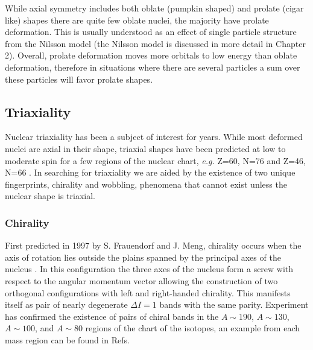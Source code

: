 While axial symmetry includes both oblate (pumpkin shaped) and prolate (cigar like) shapes there are quite few oblate nuclei, the majority have prolate deformation. This is usually understood as an effect of single particle structure from the Nilsson model (the Nilsson model is discussed in more detail in Chapter 2). Overall, prolate deformation moves more orbitals to low energy than oblate deformation, therefore in situations where there are several particles a sum over these particles will favor prolate shapes.

\subsection{Triaxiality}
\label{ssec:intro-rot-triax}
Nuclear triaxiality has been a subject of interest for years. While most deformed nuclei are axial in their shape, triaxial shapes have been predicted at low to moderate spin for a few regions of the nuclear chart, \emph{e.g.} Z=60, N=76 and Z=46, N=66  \cite{groundStateTriax}. In searching for triaxiality we are aided by the existence of two unique fingerprints, chirality and wobbling, phenomena that cannot exist unless the nuclear shape is triaxial.

\subsubsection{Chirality}
\label{sssec:intro-rot-chiral}
First predicted in 1997  by S. Frauendorf and J. Meng, chirality occurs when the axis of rotation lies outside the plains spanned by the principal axes of the nucleus \cite{frauendorfChirality,chiralityOfNuclearRotation,frauendorfTAC}. In this configuration the three axes of the nucleus form a screw with respect to the angular momentum vector allowing the construction of two orthogonal configurations with left and right-handed chirality. This manifests itself as pair of nearly degenerate $\Delta{}I=1$ bands with the same parity. Experiment has confirmed the existence of pairs of chiral bands in the $A\sim{}190$, $A\sim{}130$, $A\sim{}100$, and  $A\sim{}80$ regions of the chart of the isotopes, an example from each mass region can be found in Refs. \cite{chiralityMore135Nd,chiralityIn104Rh,chiralityIn188Ir,chiralityIn80Br}

